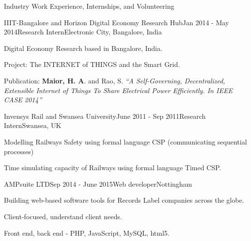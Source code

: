 \documentclass{resume} %
\begin{document}
\begin{rSection}{Industry Work Experience, Internships, and Volunteering}
	\begin{rSubsection}{IIIT-Bangalore and Horizon Digital Economy Research Hub}{Jan 2014 - May 2014}{Research Intern}{Electronic City, Bangalore, India}
		\item Digital Economy Research based in Bangalore, India.
		\item Project: The INTERNET of THINGS and the Smart Grid.
		\item Publication: \textbf{Maior, H. A}. and Rao, S.  \emph{``A Self-Governing, Decentralized, Extensible Internet of Things To Share Electrical Power Efficiently. In IEEE CASE 2014''}
	\end{rSubsection}
	\begin{rSubsection}{Invensys Rail and Swansea University}{June 2011 - Sep 2011}{Research Intern}{Swansea, UK}
		\item Modelling Railways Safety using formal language CSP (communicating sequential processes)
		\item Time simulating capacity of Railways using formal language Timed CSP.
	\end{rSubsection}


  \begin{rSubsection}{AMPsuite LTD}{Sep 2014 - June 2015}{Web developer}{Nottingham}
        \item Building web-based software tools for Records Label companies across the globe.
        \item Client-focused, understand client needs.
        \item Front end, back end - PHP, JavaScript, MySQL, html5.
    \end{rSubsection}

\end{rSection}
\end{document}
